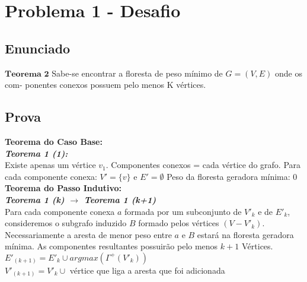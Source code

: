 \documentclass[12pt]{article}
\begin{document}
\section{Problema 1 - Desafio}

\subsection{ Enunciado }
\indent $\mathbf{Teorema}$ $\mathbf{2}$ Sabe-se encontrar a floresta de peso mínimo de $G = (V, E)$ onde os com-
ponentes conexos possuem pelo menos K vértices.


\subsection{ Prova }

\textbf{Teorema do Caso Base:}\\

\textit{\textbf{Teorema 1 (1):}}\\
Existe apenas um vértice $v_1$.
Componentes conexos = cada vértice do grafo.
Para cada componente conexa: $V'=\{v\}$ e $E' = \emptyset$
Peso da floresta geradora mínima: 0\\

\textbf{Teorema do Passo Indutivo:}\\

\textit{\textbf{Teorema 1 (k) $\rightarrow$ Teorema 1 (k+1)}}\\
Para cada componente conexa $a$ formada por um subconjunto de $V'_k$ e de $E'_k$, consideremos o subgrafo induzido $B$ formado pelos vértices $\left( V - V'_k \right)$. Necessariamente a aresta de menor peso entre $a$ e $B$ estará na floresta geradora mínima. As componentes resultantes possuirão
pelo menos $k + 1$ Vértices.\\

$E'_{(k+1)} = E'_k \cup {argmax(\Gamma^+(V'_k))}$\\
$V'_{(k+1)} = V'_k \cup$ vértice que liga a aresta que foi adicionada\\
\end{document}
